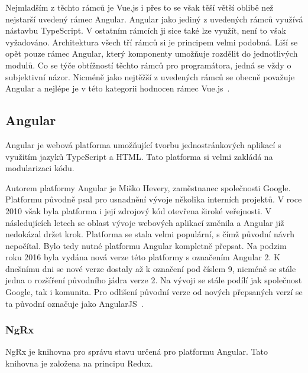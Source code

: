 Nejmladším z těchto rámců je Vue.js i přes to se však těší větší oblibě než nejstarší uvedený rámec Angular. Angular jako jediný z uvedených rámců využívá nástavbu TypeScript. V ostatním rámcích ji sice také lze využít, není to však vyžadováno. Architektura všech tří rámců si je principem velmi podobná. Liší se opět pouze rámec Angular, který komponenty umožňuje rozdělit do jednotlivých modulů. Co se týče obtížností těchto rámců pro programátora, jedná se vždy o subjektivní názor. Nicméně jako nejtěžší z uvedených rámců se obecně považuje Angular a nejlépe je v této kategorii hodnocen rámec Vue.js~\cite{bib:angular-vs-react-vs-vue}.



\subsection{Angular}
Angular je webová platforma umožňující tvorbu jednostránkových aplikací s využitím jazyků TypeScript a HTML. Tato platforma si velmi zakládá na modularizaci kódu.
\blindtext[2] %

Autorem platformy Angular je Miško Hevery, zaměstnanec společnosti Google. Platformu původně psal pro usnadnění vývoje několika interních projektů. V roce 2010 však byla platforma i její zdrojový kód otevřena široké veřejnosti. V následujících letech se oblast vývoje webových aplikací změnila a Angular již nedokázal držet krok. Platforma se stala velmi populární, s čímž původní návrh nepočítal. Bylo tedy nutné platformu Angular kompletně přepsat. Na podzim roku 2016 byla vydána nová verze této platformy s označením Angular 2. K dnešnímu dni se nové verze dostaly až k označení pod číslem 9, nicméně se stále jedna o rozšíření původního jádra verze 2. Na vývoji se stále podílí jak společnost Google, tak i komunita. Pro odlišení původní verze od nových přepsaných verzí se ta původní označuje jako AngularJS~\cite{bib:angular-history}.

\subsubsection{NgRx}\label{sec:ngrx}
NgRx je knihovna pro správu stavu určená pro platformu Angular. Tato knihovna je založena na principu Redux.
\blindtext %

